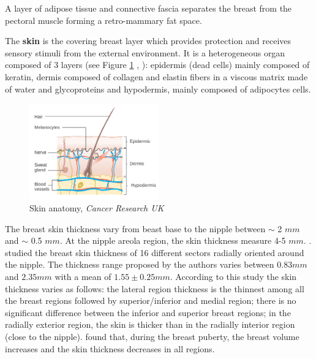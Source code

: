  A layer of adipose tissue and connective fascia separates the breast from the pectoral muscle forming a retro-mammary fat space.
 
The \textbf{skin} is the covering breast layer which provides protection and receives sensory stimuli from the external environment. It is a heterogeneous organ composed of 3 layers (see Figure \ref{fig:skinanatomy} , \citep{kanitakis2002anatomy} ): epidermis (dead cells) mainly composed of keratin, dermis composed of collagen and elastin fibers in a viscous matrix made of water and glycoproteins and hypodermis, mainly composed of adipocytes cells.


\begin{figure}[!h]
\centering
\centerline{\includegraphics[width=0.5\textwidth,keepaspectratio]{figures/skin_2.jpg} }
\caption{Skin anatomy, \textit{Cancer Research UK}}
\label{fig:skinanatomy}
\end{figure}



The breast skin thickness vary from beast base to the nipple between $\sim$ 2 $mm$ and $\sim$ 0.5 $mm$. At the nipple areola region, the skin thickness measure 4-5 $mm$.
 \citep{andolina2011mammographic}. \cite{sutradhar_vivo_2013} studied the breast skin thickness of 16 different sectors radially oriented around the nipple. The thickness range proposed by the authors varies between $0.83 mm$ and $2.35 mm$ with a mean of $1.55 \pm 0.25 mm$. According to this study the skin thickness varies as follows: the lateral
region thickness is the thinnest among all the breast regions followed by superior/inferior and medial region; there is no significant difference between the inferior and superior breast regions; in the radially exterior region, the skin is thicker than in the radially interior region (close to the nipple).  \cite{ulger2003effect} found that, during the breast puberty, the breast volume increases and the skin thickness decreases in all regions.

